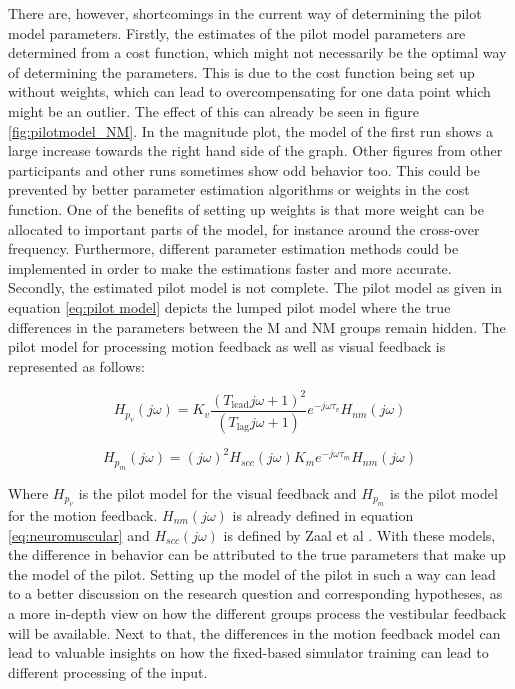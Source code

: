 \documentclass[conference]{IEEEtran}
\begin{document}

There are, however, shortcomings in the current way of determining the pilot model parameters. Firstly, the estimates of the pilot model parameters are determined from a cost function, which might not necessarily be the optimal way of determining the parameters. This is due to the cost function being set up without weights, which can lead to overcompensating for one data point which might be an outlier. The effect of this can already be seen in figure \ref{fig:pilotmodel_NM}. In the magnitude plot, the model of the first run shows a large increase towards the right hand side of the graph. Other figures from other participants and other runs sometimes show odd behavior too. This could be prevented by better parameter estimation algorithms or weights in the cost function. One of the benefits of setting up weights is that more weight can be allocated to important parts of the model, for instance around the cross-over frequency. Furthermore, different parameter estimation methods could be implemented in order to make the estimations faster and more accurate.\\


Secondly, the estimated pilot model is not complete. The pilot model as given in equation \ref{eq:pilot model} depicts the lumped pilot model where the true differences in the parameters between the M and NM groups remain hidden. The pilot model for processing motion feedback as well as visual feedback is represented as follows\cite{zaal2009use}: 

\begin{equation}
    H_{p_v} (j \omega) = K_v \frac{(T_{\text{lead}} j \omega + 1)^2}{(T_{\text{lag}} j \omega + 1)} e^{-j \omega \tau_v} H_{nm} (j \omega)
\end{equation}

\begin{equation}
    H_{p_m} (j \omega) = (j \omega)^2 H_{scc} (j \omega) K_m e^{-j \omega \tau_m} H_{nm} (j \omega)
\end{equation}

Where $H_{p_v}$ is the pilot model for the visual feedback and $H_{p_m}$ is the pilot model for the motion feedback. $H_{nm} (j \omega)$ is already defined in equation \ref{eq:neuromuscular} and $H_{scc} (j \omega)$ is defined by Zaal et al \cite{zaal2009modeling}. With these models, the difference in behavior can be attributed to the true parameters that make up the model of the pilot. Setting up the model of the pilot in such a way can lead to a better discussion on the research question and corresponding hypotheses, as a more in-depth view on how the different groups process the vestibular feedback will be available. Next to that, the differences in the motion feedback model can lead to valuable insights on how the fixed-based simulator training can lead to different processing of the input.\\ 
\end{document}
